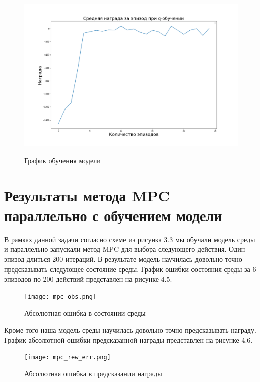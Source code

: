 \begin{figure}[!h]
\caption {График обучения модели}
	\centering
	\includegraphics[scale=0.5]{rews.png}
	\label{fig:agent}
\end{figure}



\section{Результаты метода MPC параллельно с обучением модели}\label{1sec:optimal-control}

В рамках данной задачи согласно схеме из рисунка 3.3 мы обучали модель среды и параллельно запускали метод MPC для выбора следующего действия. Один эпизод длиться 200 итераций. В результате модель научилась довольно точно предсказывать следующее состояние среды. График ошибки состояния среды за 6 эпизодов по 200 действий представлен на рисунке 4.5. \newpage

\begin{figure}[!h]
	\caption {Абсолютная ошибка в состоянии среды}
	\centering
	\texttt{[image: mpc\_obs.png]}
	\label{fig:agent}
\end{figure}

Кроме того наша модель среды научилась довольно точно предсказывать награду. График абсолютной ошибки предсказанной награды представлен на рисунке 4.6. \newpage

\begin{figure}[!h]
	\caption {Абсолютная ошибка в предсказании награды}
	\centering
	\texttt{[image: mpc\_rew\_err.png]}
	\label{fig:agent}
\end{figure}

